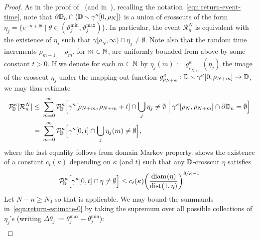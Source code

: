\documentclass[a4paper, 11pt]{article}
\theoremstyle{definition}
\numberwithin{equation}{section}
\numberwithin{figure}{section}
\renewcommand{\dist}[1][]{\operatorname{dist}_{#1}}
\renewcommand{\diam}[1][]{\operatorname{diam}_{#1}}
\newcommand{\rhittingtime}[1][]{\rho_{#1}}
\newcommand{\rDmeas}[1]{\mathcal{P}^{#1}_{\!\bD}}
\newcommand{\returnevent}[2]{\mathcal{R}_{#1}^{#2}}
\newcommand{\cond}{\;|\;}
\newcommand{\condBig}{\;\Big|\;}
\begin{document}
\begin{proof}
As in the proof of~\cite[Theorem~1]{Lawler:Continuity_of_radial_and_two-sided_radial_SLE_at_the_terminal_point} 
(and in~\cite[Proposition~3.2]{Field-Lawler:Escape_probability_and_transience_for_SLE}), 
recalling the notation~\eqref{eqn:return-event-time},  
note that $\partial \bD_n \cap (\bD \smallsetminus \gamma^{\kappa}[0,\rhittingtime[N]])$ is a union of crosscuts of the form 
$\eta_j = \{ e^{-n+\ii \theta} \cond \theta \in ( \vartheta_j^{\min}, \vartheta_j^{\max} ) \}$. In particular, the event $\returnevent{n}{N}$ is equivalent with the existence of $\eta_j$ such that $\gamma[\rhittingtime[N], \infty) \cap \eta_j \ne \emptyset$. 
Note also that the random time increments $\rhittingtime[{m+1}] - \rhittingtime[m]$, for $m \in \mathbb{N}$, 
are uniformly bounded from above by some constant $t > 0$. 
If we denote for each $m \in \mathbb{N}$ by $\eta_j(m) := g^\kappa_{\rhittingtime[N+m]}(\eta_j)$ the image of the crosscut $\eta_j$ under the mapping-out function $g^\kappa_{\rhittingtime[N+m]} \colon \bD\smallsetminus \gamma^\kappa[0,\rhittingtime[N+m]] \to \bD$, we may thus estimate
\begin{align}\label{eqn:return-estimate-0}
\begin{split}
\rDmeas{\kappa}[\returnevent{n}{N}] \le\;& \sum_{m = 0}^\infty \rDmeas{\kappa} \Big[ \gamma^\kappa[\rhittingtime[N+m], \rhittingtime[N+m]+t] \cap \bigcup_j \eta_j \ne \emptyset \condBig \gamma^\kappa[\rhittingtime[N], \rhittingtime[N+m]] \cap \partial \bD_n = \emptyset \Big]\\
=\;& \sum_{m=0}^\infty \rDmeas{\kappa}\Big[\gamma^\kappa[0,t] \cap \bigcup_j \eta_j(m) \ne \emptyset\Big],
\end{split}
\end{align}
where the last equality follows from domain Markov property. 
\cite[Lemma~4.2]{Lawler:Continuity_of_radial_and_two-sided_radial_SLE_at_the_terminal_point} shows the existence of a constant $c_t(\kappa)$ depending on $\kappa$ (and $t$) such that any $\mathbb{D}$-crosscut $\eta$ satisfies
\begin{align}\label{eqn:return-probability-finite}
\rDmeas{\kappa}\Big[\gamma^\kappa[0,t] \cap \eta \ne \emptyset\Big] \le c_t(\kappa)\bigg( \frac{\diam(\eta)}{\dist(1,\eta)} \bigg)^{8/\kappa-1}
\end{align}
Let $N-n \ge N_0$ so that  is applicable. 
We may bound the summands in~\eqref{eqn:return-estimate-0} by taking the supremum over all possible collections of $\eta_j$'s 
(writing $\Delta\theta_j := \theta_j^{\max}-\theta_j^{\min}$):
\begin{align*}

\end{align*}
\end{proof}
\end{document}
